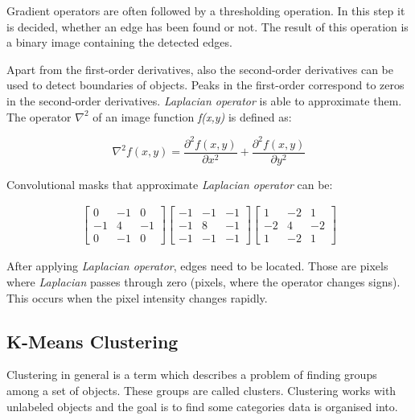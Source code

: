 Gradient operators are often followed by a thresholding operation. In this step it is decided, whether an edge has been found or not. The result of this operation is a binary image containing the detected edges.  

Apart from the first-order derivatives, also the second-order derivatives can be used to detect boundaries of objects. Peaks in the first-order correspond to zeros in the second-order derivatives. \textit{Laplacian operator} is able to approximate them. The operator $\nabla^2$ of an image function \textit{f(x,y)} is defined as:

\begin{equation}
    \nabla^2f(x,y) = \frac{\partial^2 f(x,y)}{\partial x^2} + 
    \frac{\partial^2 f(x,y)}{\partial y^2}
\end{equation}

Convolutional masks that approximate \textit{Laplacian operator} can be:

\[ 
\begin{array}{cc}

    \begin{bmatrix}
    0 & -1 & 0 \\
    -1 & 4 & -1 \\
    0 & -1 & 0 
    \end{bmatrix} 

    \begin{bmatrix}
    -1 & -1 & -1 \\
    -1 & 8 & -1 \\
    -1 & -1 & -1
    \end{bmatrix}
    
    \begin{bmatrix}
    1 & -2 & 1 \\
    -2 & 4 & -2 \\
    1 & -2 & 1
    \end{bmatrix}
    
\end{array}
\]

After applying \textit{Laplacian operator}, edges need to be located. Those are pixels where \textit{Laplacian} passes through zero (pixels, where the operator changes signs). This occurs when the pixel intensity changes rapidly.

\subsection{K-Means Clustering}
Clustering in general is a term which describes a problem of finding groups among a set of objects. These groups are called clusters. Clustering works with unlabeled objects and the goal is to find some categories data is organised into.

